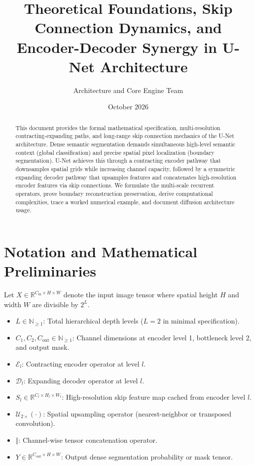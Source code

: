 \documentclass[11pt,a4paper]{article}
\title{\textbf{Theoretical Foundations, Skip Connection Dynamics, and Encoder-Decoder Synergy in U-Net Architecture}}
\author{Architecture and Core Engine Team}
\date{October 2026}
\theoremstyle{definition}
\begin{document}
\maketitle

\begin{abstract}
This document provides the formal mathematical specification, multi-resolution contracting-expanding paths, and long-range skip connection mechanics of the U-Net architecture. Dense semantic segmentation demands simultaneous high-level semantic context (global classification) and precise spatial pixel localization (boundary segmentation). U-Net achieves this through a contracting encoder pathway that downsamples spatial grids while increasing channel capacity, followed by a symmetric expanding decoder pathway that upsamples features and concatenates high-resolution encoder features via skip connections. We formulate the multi-scale recurrent operators, prove boundary reconstruction preservation, derive computational complexities, trace a worked numerical example, and document diffusion architecture usage.
\end{abstract}

\section{Notation and Mathematical Preliminaries}

Let $X \in \mathbb{R}^{C_{\text{in}} \times H \times W}$ denote the input image tensor where spatial height $H$ and width $W$ are divisible by $2^L$.

\begin{itemize}
    \item $L \in \mathbb{N}_{\ge 1}$: Total hierarchical depth levels ($L = 2$ in minimal specification).
    \item $C_1, C_2, C_{\text{out}} \in \mathbb{N}_{\ge 1}$: Channel dimensions at encoder level 1, bottleneck level 2, and output mask.
    \item $\mathcal{E}_l$: Contracting encoder operator at level $l$.
    \item $\mathcal{D}_l$: Expanding decoder operator at level $l$.
    \item $S_l \in \mathbb{R}^{C_l \times H_l \times W_l}$: High-resolution skip feature map cached from encoder level $l$.
    \item $\mathcal{U}_{2\times}(\cdot)$: Spatial upsampling operator (nearest-neighbor or transposed convolution).
    \item $\mathbin{\Vert}$: Channel-wise tensor concatenation operator.
    \item $Y \in \mathbb{R}^{C_{\text{out}} \times H \times W}$: Output dense segmentation probability or mask tensor.
\end{itemize}
\end{document}
